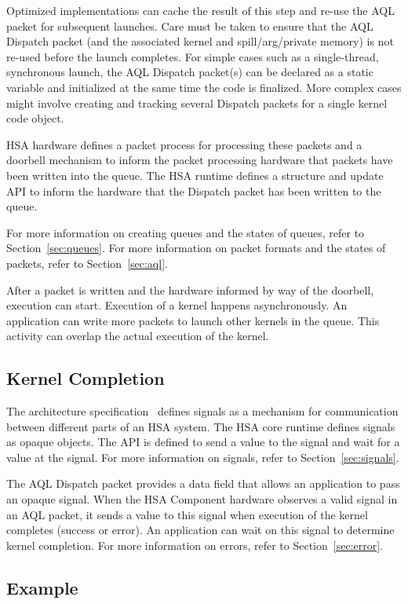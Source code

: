 \documentclass[final]{book}
\begin{document}
Optimized implementations can cache the result of this step and re-use the AQL
packet for subsequent launches. Care must be taken to ensure that the AQL
Dispatch packet (and the associated kernel and spill/arg/private memory) is not
re-used before the launch completes. For simple cases such as a
single-thread, synchronous launch, the AQL Dispatch packet(s) can be declared
as a static variable and initialized at the same time the code is
finalized. More complex cases might involve creating and tracking several
Dispatch packets for a single kernel code object.

HSA hardware defines a packet process for processing these packets and a
doorbell mechanism to inform the packet processing hardware that packets have
been written into the queue. The HSA runtime defines a structure and update API
to inform the hardware that the Dispatch packet has been written to the queue.

For more information on creating queues and the states of queues, refer to
Section~\ref{sec:queues}. For more information on packet formats and the states
of packets, refer to Section~\ref{sec:aql}.

After a packet is written and the hardware informed by way of the doorbell,
execution can start. Execution of a kernel happens asynchronously. An application
can write more packets to launch other kernels in the queue. This activity can
overlap the actual execution of the kernel.

\subsection{Kernel Completion}
The architecture specification~\cite{sar} defines signals as a mechanism for
communication between different parts of an HSA system. The HSA core runtime
defines signals as opaque objects. The API is defined to send a value to the
signal and wait for a value at the signal. For more information on signals,
refer to Section~\ref{sec:signals}.

The AQL Dispatch packet provides a data field that allows an application to pass
an opaque signal. When the HSA Component hardware observes a valid signal in
an AQL packet, it sends a value to this signal when execution of the kernel
completes (success or error). An application can wait on this signal to determine
kernel completion. For more information on errors, refer to
Section~\ref{sec:error}.

\subsection{Example}

\end{document}
